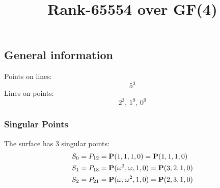 \documentclass{article}
\newcommand\setTBstruts{\def\T{\rule{0pt}{2.6ex}}%
\def\B{\rule[-1.2ex]{0pt}{0pt}}}
\newcommand{\bP}{{\bf P}}
\begin{document}
 
\setTBstruts



{\allowdisplaybreaks%






\title{Rank-65554 over GF(4)}
\author{}%
\maketitle%
%
{}



\subsection*{General information}
Points on lines:
$$
5^3$$
Lines on points:
$$
2^3,\,1^9,\,0^9$$
\subsubsection*{Singular Points}
The surface has 3 singular points:\\
\begin{align*}
S_{0} &= P_{12}=\bP(1, 1, 1, 0) = \bP(1, 1, 1, 0)\\
S_{1} &= P_{18}=\bP(\omega^{2}, \omega , 1, 0) = \bP(3, 2, 1, 0)\\
S_{2} &= P_{21}=\bP(\omega , \omega^{2}, 1, 0) = \bP(2, 3, 1, 0)\\
\end{align*}
}
\end{document}
